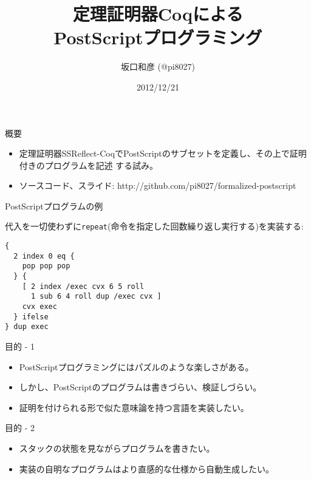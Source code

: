 \documentclass[cjk, 14pt, dvipdfm]{beamer}
\title{定理証明器Coqによる\\PostScriptプログラミング}
\author{坂口和彦 (@pi8027)}
\institute{情報科学類 B2}
\date{2012/12/21}
\begin{document}
\begin{frame}[plain]

 \maketitle

\end{frame}

\begin{frame}{概要}

 \begin{itemize}
  \item 定理証明器SSReflect-CoqでPostScriptのサブセットを定義し、その上で証明付きのプログラムを記述
	する試み。
  \item ソースコード、スライド: http://github.com/pi8027/formalized-postscript
 \end{itemize}

\end{frame}

\begin{frame}[fragile]{PostScriptプログラムの例}

 代入を一切使わずに\texttt{repeat}(命令を指定した回数繰り返し実行する)を実装する:

\begin{lstlisting}[style=postscript]
{
  2 index 0 eq {
    pop pop pop
  } {
    [ 2 index /exec cvx 6 5 roll
      1 sub 6 4 roll dup /exec cvx ]
    cvx exec
  } ifelse
} dup exec
\end{lstlisting}

\end{frame}

\begin{frame}{目的 - 1}

 \begin{itemize}
  \item PostScriptプログラミングにはパズルのような楽しさがある。
  \item しかし、PostScriptのプログラムは書きづらい、検証しづらい。
  \item 証明を付けられる形で似た意味論を持つ言語を実装したい。
 \end{itemize}

\end{frame}

\begin{frame}{目的 - 2}

 \begin{itemize}
  \item スタックの状態を見ながらプログラムを書きたい。
  \item 実装の自明なプログラムはより直感的な仕様から自動生成したい。
 \end{itemize}

\end{frame}
\end{document}
